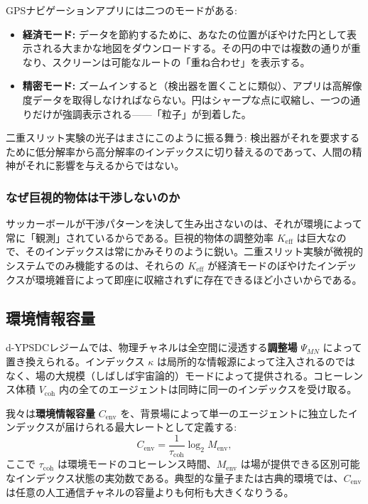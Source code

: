 \documentclass[12pt,a4paper]{article}
\theoremstyle{definition}
\theoremstyle{remark}
\begin{document}
	GPSナビゲーションアプリには二つのモードがある:
	\begin{itemize}
		\item \textbf{経済モード:} データを節約するために、あなたの位置がぼやけた円として表示される大まかな地図をダウンロードする。その円の中では複数の通りが重なり、スクリーンは可能なルートの「重ね合わせ」を表示する。
		\item \textbf{精密モード:} ズームインすると（検出器を置くことに類似）、アプリは高解像度データを取得しなければならない。円はシャープな点に収縮し、一つの通りだけが強調表示される——「粒子」が到着した。
	\end{itemize}
	二重スリット実験の光子はまさにこのように振る舞う: 検出器がそれを要求するために低分解率から高分解率のインデックスに切り替えるのであって、人間の精神がそれに影響を与えるからではない。
	
	\subsubsection{なぜ巨視的物体は干渉しないのか}
	
	サッカーボールが干渉パターンを決して生み出さないのは、それが環境によって常に「観測」されているからである。巨視的物体の調整効率 $K_{\mathrm{eff}}$ は巨大なので、そのインデックスは常にかみそりのように鋭い。二重スリット実験が微視的システムでのみ機能するのは、それらの $K_{\mathrm{eff}}$ が経済モードのぼやけたインデックスが環境雑音によって即座に収縮されずに存在できるほど小さいからである。
	
	\subsection{環境情報容量}
	\label{subsec:env-capacity}
	
	d-YPSDCレジームでは、物理チャネルは全空間に浸透する\textbf{調整場} $\Psi_{MN}$ によって置き換えられる。インデックス $\kappa$ は局所的な情報源によって注入されるのではなく、場の大規模（しばしば宇宙論的）モードによって提供される。コヒーレンス体積 $V_{\mathrm{coh}}$ 内の全てのエージェントは同時に同一のインデックスを受け取る。
	
	我々は\textbf{環境情報容量} $C_{\mathrm{env}}$ を、背景場によって単一のエージェントに独立したインデックスが届けられる最大レートとして定義する:
	\begin{equation}
		C_{\mathrm{env}} = \frac{1}{\tau_{\mathrm{coh}}} \log_2 M_{\mathrm{env}},
		\label{eq:Cenv}
	\end{equation}
	ここで $\tau_{\mathrm{coh}}$ は環境モードのコヒーレンス時間、$M_{\mathrm{env}}$ は場が提供できる区別可能なインデックス状態の実効数である。典型的な量子または古典的環境では、$C_{\mathrm{env}}$ は任意の人工通信チャネルの容量よりも何桁も大きくなりうる。
	
\end{document}
